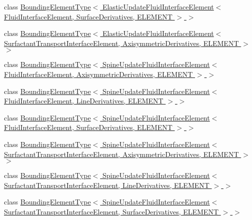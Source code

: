 \begin{DoxyCompactItemize}
class \hyperlink{classoomph_1_1BoundingElementType_3_01ElasticUpdateFluidInterfaceElement_3_01FluidInterfaceEleme0e022f57b173f7bea5703185db24e722}{Bounding\+Element\+Type$<$ Elastic\+Update\+Fluid\+Interface\+Element$<$ Fluid\+Interface\+Element, Surface\+Derivatives, E\+L\+E\+M\+E\+N\+T $>$ $>$}
\item 
class \hyperlink{classoomph_1_1BoundingElementType_3_01ElasticUpdateFluidInterfaceElement_3_01SurfactantTransportdc53e7a70087d96a28c80f422fe03679}{Bounding\+Element\+Type$<$ Elastic\+Update\+Fluid\+Interface\+Element$<$ Surfactant\+Transport\+Interface\+Element, Axisymmetric\+Derivatives, E\+L\+E\+M\+E\+N\+T $>$ $>$}
\item 
class \hyperlink{classoomph_1_1BoundingElementType_3_01SpineUpdateFluidInterfaceElement_3_01FluidInterfaceElement7e4c3b8d4bf0b8ea24b4420ab41b2522}{Bounding\+Element\+Type$<$ Spine\+Update\+Fluid\+Interface\+Element$<$ Fluid\+Interface\+Element, Axisymmetric\+Derivatives, E\+L\+E\+M\+E\+N\+T $>$ $>$}
\item 
class \hyperlink{classoomph_1_1BoundingElementType_3_01SpineUpdateFluidInterfaceElement_3_01FluidInterfaceElement0079ff469c68e949ddcf7a17f32ba6a9}{Bounding\+Element\+Type$<$ Spine\+Update\+Fluid\+Interface\+Element$<$ Fluid\+Interface\+Element, Line\+Derivatives, E\+L\+E\+M\+E\+N\+T $>$ $>$}
\item 
class \hyperlink{classoomph_1_1BoundingElementType_3_01SpineUpdateFluidInterfaceElement_3_01FluidInterfaceElement967a9cdd4c55a2ab80dbfbe6be84b5ab}{Bounding\+Element\+Type$<$ Spine\+Update\+Fluid\+Interface\+Element$<$ Fluid\+Interface\+Element, Surface\+Derivatives, E\+L\+E\+M\+E\+N\+T $>$ $>$}
\item 
class \hyperlink{classoomph_1_1BoundingElementType_3_01SpineUpdateFluidInterfaceElement_3_01SurfactantTransportIn96bc27501b38520de44b2adcd1d39239}{Bounding\+Element\+Type$<$ Spine\+Update\+Fluid\+Interface\+Element$<$ Surfactant\+Transport\+Interface\+Element, Axisymmetric\+Derivatives, E\+L\+E\+M\+E\+N\+T $>$ $>$}
\item 
class \hyperlink{classoomph_1_1BoundingElementType_3_01SpineUpdateFluidInterfaceElement_3_01SurfactantTransportIn1a79ed5e636f8826f4a8a00ba9f037b4}{Bounding\+Element\+Type$<$ Spine\+Update\+Fluid\+Interface\+Element$<$ Surfactant\+Transport\+Interface\+Element, Line\+Derivatives, E\+L\+E\+M\+E\+N\+T $>$ $>$}
\item 
class \hyperlink{classoomph_1_1BoundingElementType_3_01SpineUpdateFluidInterfaceElement_3_01SurfactantTransportIn0aa155ddfcfcc4520e061f144b3ee14d}{Bounding\+Element\+Type$<$ Spine\+Update\+Fluid\+Interface\+Element$<$ Surfactant\+Transport\+Interface\+Element, Surface\+Derivatives, E\+L\+E\+M\+E\+N\+T $>$ $>$}

\end{DoxyCompactItemize}
